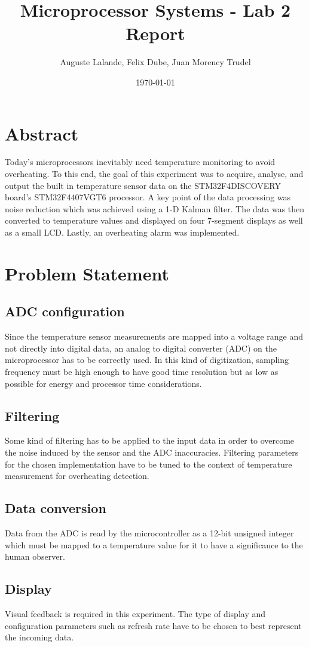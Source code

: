 \documentclass[12pt]{article}
\title{Microprocessor Systems - Lab 2 Report}
\author{Auguste Lalande, Felix Dube, Juan Morency Trudel}
\date{\today}
\begin{document}
\maketitle
\clearpage

\tableofcontents
\clearpage

\section{Abstract}
Today's microprocessors inevitably need temperature monitoring to avoid overheating. To this end, the goal of this experiment was to acquire, analyse, and output the built in temperature sensor data on the STM32F4DISCOVERY board's STM32F4407VGT6 processor. A key point of the data processing was noise reduction which was achieved using a 1-D Kalman filter. The data was then converted to temperature values and displayed on four 7-segment displays as well as a small LCD. Lastly, an overheating alarm was implemented.

\section{Problem Statement}
\subsection{ADC configuration} Since the temperature sensor measurements are mapped into a voltage range and not directly into digital data, an analog to digital converter (ADC) on the microprocessor has to be correctly used. In this kind of digitization, sampling frequency must be high enough to have good time resolution but as low as possible for energy and processor time considerations.
\subsection{Filtering}
Some kind of filtering has to be applied to the input data in order to overcome the noise induced by the sensor and the ADC inaccuracies. Filtering parameters for the chosen implementation have to be tuned to the context of temperature measurement for overheating detection.
\subsection{Data conversion}
Data from the ADC is read by the microcontroller as a 12-bit unsigned integer which must be mapped to a temperature value for it to have a significance to the human observer.
\subsection{Display}
Visual feedback is required in this experiment. The type of display and configuration parameters such as refresh rate have to be chosen to best represent the incoming data.
\end{document}
